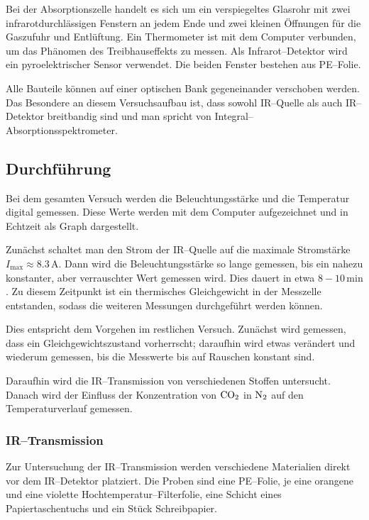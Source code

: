 \documentclass[12pt,a4paper]{scrartcl}
\numberwithin{equation}{section} %
\begin{document}
Bei der Absorptionszelle handelt es sich um ein verspiegeltes Glasrohr mit zwei infrarotdurchlässigen Fenstern an jedem Ende und zwei kleinen Öffnungen für die Gaszufuhr und Entlüftung. Ein Thermometer ist mit dem Computer verbunden, um das Phänomen des Treibhauseffekts zu messen. Als Infrarot--Detektor wird ein pyroelektrischer Sensor verwendet. Die beiden Fenster bestehen aus PE--Folie.

Alle Bauteile können auf einer optischen Bank gegeneinander verschoben werden. Das Besondere an diesem Versuchsaufbau ist, dass sowohl IR--Quelle als auch IR--Detektor breitbandig sind und man spricht von Integral--Absorptionsspektrometer.

\subsection{Durchführung}
\label{durchfuehrung}
Bei dem gesamten Versuch werden die Beleuchtungsstärke und die Temperatur digital gemessen. Diese Werte werden mit dem Computer aufgezeichnet und in Echtzeit als Graph dargestellt.

Zunächst schaltet man den Strom der IR--Quelle auf die maximale Stromstärke $I_\mathrm{max}\approx 8.3\mathrm{\,A}$. Dann wird die Beleuchtungsstärke so lange gemessen, bis ein nahezu konstanter, aber verrauschter Wert gemessen wird. Dies dauert in etwa $8-10\mathrm{\,min}$. Zu diesem Zeitpunkt ist ein thermisches Gleichgewicht in der Messzelle entstanden, sodass die weiteren Messungen durchgeführt werden können.

Dies entspricht dem Vorgehen im restlichen Versuch. Zunächst wird gemessen, dass ein Gleichgewichtszustand vorherrscht; daraufhin wird etwas verändert und wiederum gemessen, bis die Messwerte bis auf Rauschen konstant sind.

Daraufhin wird die IR--Transmission von verschiedenen Stoffen untersucht. Danach wird der Einfluss der Konzentration von $\ce{CO_2}$ in $\ce{N_2}$ auf den Temperaturverlauf gemessen.

\subsubsection{IR--Transmission}
\label{howto:IR--Transmission}

Zur Untersuchung der IR--Transmission werden verschiedene Materialien direkt vor dem IR--Detektor platziert. Die Proben sind eine PE--Folie, je eine orangene und eine violette Hochtemperatur--Filterfolie, eine Schicht eines Papiertaschentuchs und ein Stück Schreibpapier.
\end{document}
